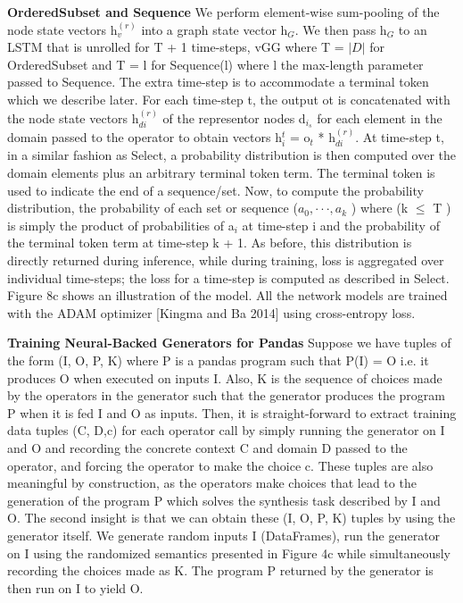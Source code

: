 \documentclass{article}
\begin{document}
\textbf{OrderedSubset and Sequence} We perform element-wise sum-pooling of the node state vectors h$^{(r)}_v$ into a graph state vector h$_G$. We then pass h$_G$ to an LSTM that is unrolled for T + 1 time-steps, vGG where T = $|D|$ for OrderedSubset and T = l for Sequence(l) where l the max-length parameter passed to Sequence. The extra time-step is to accommodate a terminal token which we describe later. For each time-step t, the output ot is concatenated with the node state vectors h$^{(r)}_{di}$ of the representor nodes d$_{i_s}$ for each element in the domain passed to the operator to obtain vectors h$_i^t$ = o$_t$ * h$^{(r)}_{di}$. At time-step t, in a similar fashion as Select, a probability distribution is then computed over the domain elements plus an arbitrary terminal token term. The terminal token is used to indicate the end of a sequence/set. Now, to compute the probability distribution, the probability of each set or sequence ($a_0, · · · , a_k$ ) where (k $\leq$ T ) is simply the product of probabilities of a$_i$ at time-step i and the probability of the terminal token term at time-step k + 1. As before, this distribution is directly returned during inference, while during training, loss is aggregated over individual time-steps; the loss for a time-step is computed as described in Select. Figure 8c shows an illustration of the model. All the network models are trained with the ADAM optimizer [Kingma and Ba 2014] using cross-entropy loss.

\textbf{Training Neural-Backed Generators for Pandas} Suppose we have tuples of the form (I, O, P, K) where P is a pandas program such that P(I) = O i.e. it produces O when executed on inputs I. Also, K is the sequence of choices made by the operators in the generator such that the generator produces the program P when it is fed I and O as inputs. Then, it is straight-forward to extract training data tuples (C, D,c) for each operator call by simply running the generator on I and O and recording the concrete context C and domain D passed to the operator, and forcing the operator to make the choice c. These tuples are also meaningful by construction, as the operators make choices that lead to the generation of the program P which solves the synthesis task described by I and O. The second insight is that we can obtain these (I, O, P, K) tuples by using the generator itself. We generate random inputs I (DataFrames), run the generator on I using the randomized semantics presented in Figure 4c while simultaneously recording the choices made as K. The program P returned by the generator is then run on I to yield O.
\end{document}
